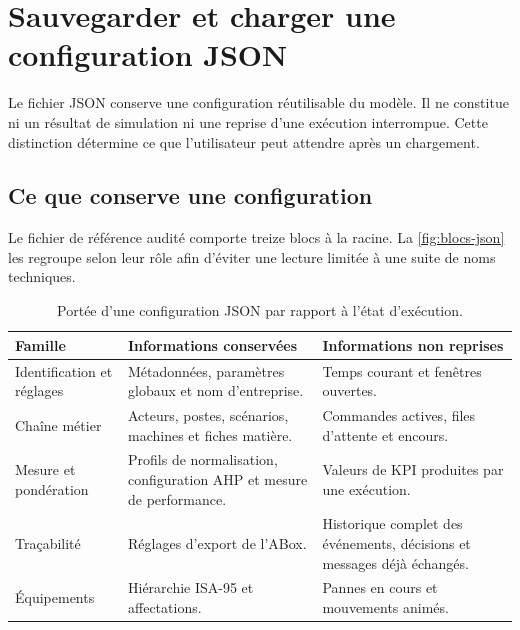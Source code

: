 \chapter{Sauvegarder et charger une configuration JSON}
\label{chap:json}

Le fichier JSON conserve une configuration réutilisable du modèle. Il ne constitue ni un résultat de simulation ni une reprise d'une exécution interrompue. Cette distinction détermine ce que l'utilisateur peut attendre après un chargement.

\section{Ce que conserve une configuration}

Le fichier de référence audité comporte treize blocs à la racine. La \cref{fig:blocs-json} les regroupe selon leur rôle afin d'éviter une lecture limitée à une suite de noms techniques.


\begin{table}[H]
  \centering
  \begin{tabularx}{\textwidth}{L{0.26\textwidth} Y Y}
    \toprule
    Famille & Informations conservées & Informations non reprises \\
    \midrule
    Identification et réglages & Métadonnées, paramètres globaux et nom d'entreprise. & Temps courant et fenêtres ouvertes. \\
    Chaîne métier & Acteurs, postes, scénarios, machines et fiches matière. & Commandes actives, files d'attente et encours. \\
    Mesure et pondération & Profils de normalisation, configuration AHP et mesure de performance. & Valeurs de KPI produites par une exécution. \\
    Traçabilité & Réglages d'export de l'ABox. & Historique complet des événements, décisions et messages déjà échangés. \\
    Équipements & Hiérarchie ISA-95 et affectations. & Pannes en cours et mouvements animés. \\
    \bottomrule
  \end{tabularx}
  \caption{Portée d'une configuration JSON par rapport à l'état d'exécution.}
  \label{tab:portee-json}
\end{table}

